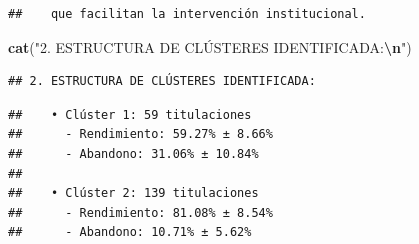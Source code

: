 \documentclass[
]{article}
\newenvironment{Shaded}{\begin{snugshade}}{\end{snugshade}}
\newcommand{\ControlFlowTok}[1]{\textcolor[rgb]{0.13,0.29,0.53}{\textbf{#1}}}
\newcommand{\DecValTok}[1]{\textcolor[rgb]{0.00,0.00,0.81}{#1}}
\newcommand{\FunctionTok}[1]{\textcolor[rgb]{0.13,0.29,0.53}{\textbf{#1}}}
\newcommand{\NormalTok}[1]{#1}
\newcommand{\OtherTok}[1]{\textcolor[rgb]{0.56,0.35,0.01}{#1}}
\newcommand{\SpecialCharTok}[1]{\textcolor[rgb]{0.81,0.36,0.00}{\textbf{#1}}}
\newcommand{\StringTok}[1]{\textcolor[rgb]{0.31,0.60,0.02}{#1}}
\begin{document}
\begin{verbatim}
##    que facilitan la intervención institucional.
\end{verbatim}

\begin{Shaded}
\begin{Highlighting}[]
\FunctionTok{cat}\NormalTok{(}\StringTok{"2. ESTRUCTURA DE CLÚSTERES IDENTIFICADA:}\SpecialCharTok{\textbackslash{}n}\StringTok{"}\NormalTok{)}
\end{Highlighting}
\end{Shaded}

\begin{verbatim}
## 2. ESTRUCTURA DE CLÚSTERES IDENTIFICADA:
\end{verbatim}

\begin{Shaded}
\end{Shaded}

\begin{verbatim}
##    • Clúster 1: 59 titulaciones
##      - Rendimiento: 59.27% ± 8.66%
##      - Abandono: 31.06% ± 10.84%
## 
##    • Clúster 2: 139 titulaciones
##      - Rendimiento: 81.08% ± 8.54%
##      - Abandono: 10.71% ± 5.62%
\end{verbatim}
\end{document}
